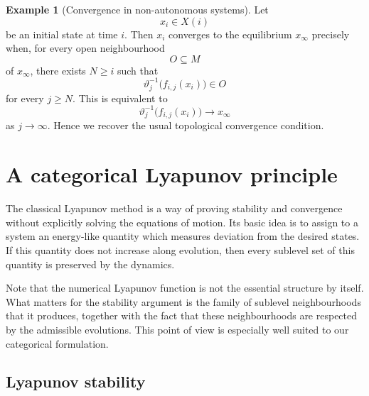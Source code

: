 \documentclass[a4paper,reqno,oneside]{amsart}
\theoremstyle{definition}
\newtheorem{example}[theorem]{Example}
\theoremstyle{remark}
\renewcommand{\theta}{\vartheta}
\numberwithin{equation}{section}
\begin{document}
\begin{example}[Convergence in non-autonomous systems]
		Let
		\begin{equation}
			x_i\in X(i)
		\end{equation}
		be an initial state at time $i$. Then $x_i$ converges to the equilibrium
		$x_\infty$ precisely when, for every open neighbourhood
		\begin{equation}
			O\subseteq M
		\end{equation}
		of $x_\infty$, there exists $N\geq i$ such that
		\begin{equation}
			\theta_j^{-1} \big(f_{i,j}(x_i) \big) \in O
		\end{equation}
		for every $j \geq N$. This is equivalent to
		\begin{equation}
			\theta_j^{-1}\bigl(f_{i,j}(x_i)\bigr)
			\longrightarrow
			x_\infty
		\end{equation}
		as $j\to\infty$. Hence we recover the usual
		topological convergence condition.
	\end{example}
	
	
	
	
	
	
	\section{A categorical Lyapunov principle}
	
	The classical Lyapunov method is a way of proving stability and convergence
	without explicitly solving the equations of motion. Its basic idea is to
	assign to a system an energy-like quantity which measures deviation from the
	desired states. If this quantity does not increase along evolution,
	then every sublevel set of this quantity is preserved by the dynamics.


	
	Note that the numerical Lyapunov function
	is not the essential structure by itself. What matters for the stability
	argument is the family of sublevel neighbourhoods that it produces, together with the fact that these neighbourhoods are respected by the admissible evolutions. This point of view is especially well suited to our categorical formulation.
	


    \subsection{Lyapunov stability}
	
\end{document}
